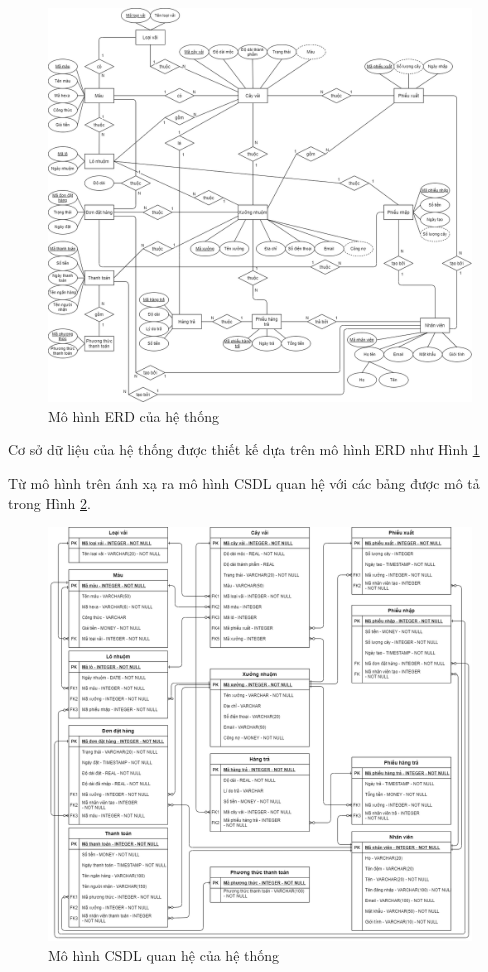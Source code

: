 \begin{figure}[!ht]
    \begin{center}
        \includegraphics[width=17cm]{Image/General/ERD.png}
        \caption{Mô hình ERD của hệ thống}
        \label{erd}
    \end{center}
\end{figure}
\newpage
Cơ sở dữ liệu của hệ thống được thiết kế dựa trên mô hình  ERD như Hình \ref{erd}

Từ mô hình trên ánh xạ ra mô hình CSDL quan hệ với các bảng được mô tả trong Hình \ref{relation_model}.

\begin{figure}[!ht]
    \begin{center}
        \includegraphics[width=17cm]{Image/General/Relational Data Model.png}
        \caption{Mô hình CSDL quan hệ của hệ thống}
        \label{relation_model}
    \end{center}
\end{figure}
\newpage